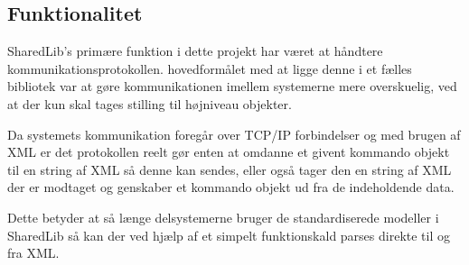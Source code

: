 \subsection{Funktionalitet}
SharedLib's primære funktion i dette projekt har været at håndtere kommunikationsprotokollen. hovedformålet med at ligge denne i et fælles bibliotek var at gøre kommunikationen imellem systemerne mere overskuelig, ved at der kun skal tages stilling til højniveau objekter.

Da systemets kommunikation foregår over TCP/IP forbindelser og med brugen af XML er det protokollen reelt gør enten at omdanne et givent kommando objekt til en string af XML så denne kan sendes, eller også tager den en string af XML der er modtaget og genskaber et kommando objekt ud fra de indeholdende data.

Dette betyder at så længe delsystemerne bruger de standardiserede modeller i SharedLib så kan der ved hjælp af et simpelt funktionskald parses direkte til og fra XML. 